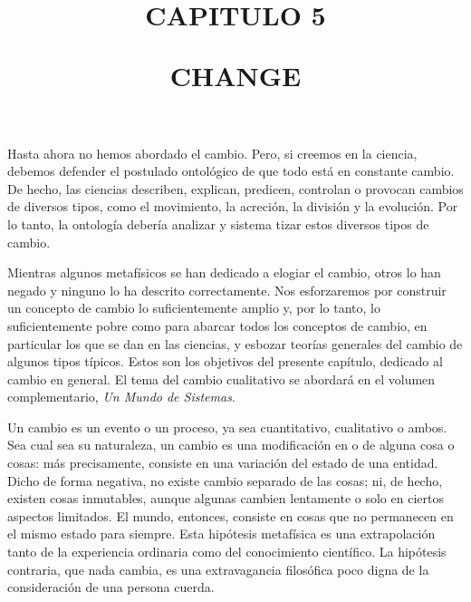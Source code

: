 \documentclass[11pt]{article}
\title{
  \normalsize CAPITULO 5
  \vspace{0.5cm}
  \begin{center}
    \large CHANGE
  \end{center}
  }
\date{}
\begin{document}
\maketitle
\thispagestyle{empty}
\vspace{-1cm}

\begin{justifying}
  \noindent 
  Hasta ahora no hemos abordado el cambio. Pero, si creemos en la ciencia, debemos defender el postulado ontológico de que todo 
  está en constante cambio. De hecho, las ciencias describen, explican, predicen, 
  controlan o provocan cambios de diversos tipos, como el movimiento, la acreción, 
  la división y la evolución. Por lo tanto, la ontología debería analizar y sistema tizar estos diversos tipos de cambio.

  Mientras algunos metafísicos se han dedicado a elogiar el cambio, otros lo han negado y ninguno lo ha descrito correctamente. Nos esforzaremos por construir un concepto de cambio lo suficientemente amplio y, por lo tanto, lo suficientemente pobre como para abarcar todos los conceptos de cambio, en particular los que se dan en las ciencias, y esbozar teorías generales del cambio de algunos tipos típicos. Estos son los objetivos del presente capítulo, dedicado al cambio en general. El tema del cambio cualitativo se abordará en el volumen complementario, \textit{Un Mundo de Sistemas}.

  Un cambio es un evento o un proceso, ya sea cuantitativo, cualitativo o ambos. Sea cual sea su naturaleza, un cambio es una modificación en o de alguna cosa o cosas: más precisamente, consiste en una variación del estado de una entidad. Dicho de forma negativa, no existe cambio separado de las cosas; ni, de hecho, existen cosas inmutables, aunque algunas cambien lentamente o solo en ciertos aspectos limitados. El mundo, entonces, consiste en cosas que no permanecen en el mismo estado para siempre. Esta hipótesis metafísica es una extrapolación tanto de la experiencia ordinaria como del conocimiento científico. La hipótesis contraria, que nada cambia, es una extravagancia filosófica poco digna de la consideración de una persona cuerda.

\end{justifying}










\printbibliography
\end{document}

